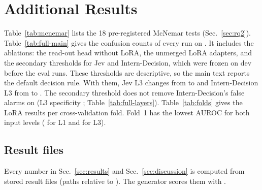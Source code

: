 \section{Additional Results}\label{app:results}



Table~\ref{tab:mcnemar} lists the 18 pre-registered McNemar tests (Sec.~\ref{sec:rq2}).
Table~\ref{tab:full-main} gives the confusion counts of every run on \Deb.
It includes the ablations: the read-out head without LoRA, the unmerged LoRA adapters,
and the secondary thresholds for Jev and Intern-Decision, which were frozen on dev before the eval runs.
These thresholds are descriptive, so the main text reports the default decision rule.
With them, Jev L3 changes from  to 
and Intern-Decision L3 from  to .
The secondary threshold does not remove Intern-Decision's false alarms on \Dead{}
(L3 specificity ; Table~\ref{tab:full-layers}).
Table~\ref{tab:folds} gives the LoRA results per cross-validation fold.
Fold~1 has the lowest \Dead{} AUROC for both input levels
( for L1 and  for L3).





\subsection{Result files}\label{app:provenance}
Every number in Sec.~\ref{sec:results} and Sec.~\ref{sec:discussion} is computed from stored result files (paths relative to ).
The generator  scores them with .


